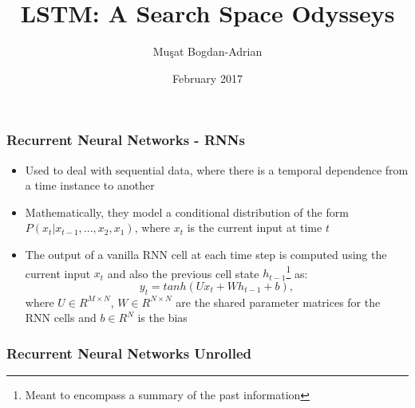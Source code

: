 \documentclass{beamer}
\title[LSTM: A Search Space Odysseys]{LSTM: A Search Space Odysseys}
\author[Mu\c sat Bogdan-Adrian]{Mu\c sat Bogdan-Adrian}
\date{February 2017}
\begin{document}
\frame{\titlepage}

\begin{frame}
\frametitle{Recurrent Neural Networks - RNNs}
\center
\begin{itemize}
	\item Used to deal with sequential data, where there is a temporal dependence from a time instance to another
	\item Mathematically, they model a conditional distribution of the form \(P(x_t \lvert x_{t-1},..., x_2, x_1) \), where \(x_t\) is the current input at time \(t\)
	\item The output of a vanilla RNN cell at each time step is computed using the current input \(x_t\) and also the previous cell state \(h_{t-1}\)\footnote{Meant to encompass a summary of the past information} as:
	\[
		y_t = tanh(Ux_t + Wh_{t-1} + b),
	\]
	where \(U \in R^{M \times N}\), \(W \in R^{N \times N}\) are the shared parameter matrices for the RNN cells and \(b \in R^N\) is the bias
\end{itemize}
\end{frame}

\begin{frame}
\frametitle{Recurrent Neural Networks Unrolled}
\begin{figure}
	\subcapcentertrue
    \centering
    \end{figure}   
\end{frame}
\end{document}

